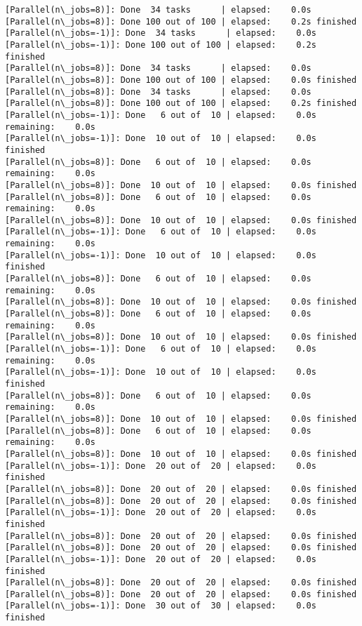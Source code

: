 \documentclass[11pt]{article}
\begin{document}
\begin{Verbatim}[commandchars=\\\{\}]
[Parallel(n\_jobs=8)]: Done  34 tasks      | elapsed:    0.0s
[Parallel(n\_jobs=8)]: Done 100 out of 100 | elapsed:    0.2s finished
[Parallel(n\_jobs=-1)]: Done  34 tasks      | elapsed:    0.0s
[Parallel(n\_jobs=-1)]: Done 100 out of 100 | elapsed:    0.2s finished
[Parallel(n\_jobs=8)]: Done  34 tasks      | elapsed:    0.0s
[Parallel(n\_jobs=8)]: Done 100 out of 100 | elapsed:    0.0s finished
[Parallel(n\_jobs=8)]: Done  34 tasks      | elapsed:    0.0s
[Parallel(n\_jobs=8)]: Done 100 out of 100 | elapsed:    0.2s finished
[Parallel(n\_jobs=-1)]: Done   6 out of  10 | elapsed:    0.0s remaining:    0.0s
[Parallel(n\_jobs=-1)]: Done  10 out of  10 | elapsed:    0.0s finished
[Parallel(n\_jobs=8)]: Done   6 out of  10 | elapsed:    0.0s remaining:    0.0s
[Parallel(n\_jobs=8)]: Done  10 out of  10 | elapsed:    0.0s finished
[Parallel(n\_jobs=8)]: Done   6 out of  10 | elapsed:    0.0s remaining:    0.0s
[Parallel(n\_jobs=8)]: Done  10 out of  10 | elapsed:    0.0s finished
[Parallel(n\_jobs=-1)]: Done   6 out of  10 | elapsed:    0.0s remaining:    0.0s
[Parallel(n\_jobs=-1)]: Done  10 out of  10 | elapsed:    0.0s finished
[Parallel(n\_jobs=8)]: Done   6 out of  10 | elapsed:    0.0s remaining:    0.0s
[Parallel(n\_jobs=8)]: Done  10 out of  10 | elapsed:    0.0s finished
[Parallel(n\_jobs=8)]: Done   6 out of  10 | elapsed:    0.0s remaining:    0.0s
[Parallel(n\_jobs=8)]: Done  10 out of  10 | elapsed:    0.0s finished
[Parallel(n\_jobs=-1)]: Done   6 out of  10 | elapsed:    0.0s remaining:    0.0s
[Parallel(n\_jobs=-1)]: Done  10 out of  10 | elapsed:    0.0s finished
[Parallel(n\_jobs=8)]: Done   6 out of  10 | elapsed:    0.0s remaining:    0.0s
[Parallel(n\_jobs=8)]: Done  10 out of  10 | elapsed:    0.0s finished
[Parallel(n\_jobs=8)]: Done   6 out of  10 | elapsed:    0.0s remaining:    0.0s
[Parallel(n\_jobs=8)]: Done  10 out of  10 | elapsed:    0.0s finished
[Parallel(n\_jobs=-1)]: Done  20 out of  20 | elapsed:    0.0s finished
[Parallel(n\_jobs=8)]: Done  20 out of  20 | elapsed:    0.0s finished
[Parallel(n\_jobs=8)]: Done  20 out of  20 | elapsed:    0.0s finished
[Parallel(n\_jobs=-1)]: Done  20 out of  20 | elapsed:    0.0s finished
[Parallel(n\_jobs=8)]: Done  20 out of  20 | elapsed:    0.0s finished
[Parallel(n\_jobs=8)]: Done  20 out of  20 | elapsed:    0.0s finished
[Parallel(n\_jobs=-1)]: Done  20 out of  20 | elapsed:    0.0s finished
[Parallel(n\_jobs=8)]: Done  20 out of  20 | elapsed:    0.0s finished
[Parallel(n\_jobs=8)]: Done  20 out of  20 | elapsed:    0.0s finished
[Parallel(n\_jobs=-1)]: Done  30 out of  30 | elapsed:    0.0s finished

\end{Verbatim}
\end{document}
